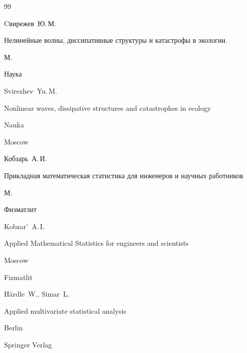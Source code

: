 \begin{thebibliography}{99}

\by Cвирежев~Ю.\,М. 

\book Нелинейные волны, диссипативные структуры и катастрофы в экологии. 

\publaddr М. 

\publ Наука



\misctransl

\by Svirezhev~Yu.\,M. 

\book Nonlinear waves, dissipative structures and catastrophes in ecology

\publ Nauka

\publaddr Moscow






\by Кобзарь~А.\,И. 

\book Прикладная математическая статистика для инженеров и научных работников

\publaddr М.

\publ Физматлит 



\misctransl

\by Kobzar'~A.\,I.

\book Applied Mathematical Statistics for engineers and scientists 

\publaddr Moscow

\publ Fizmatlit








\by H\"ardle~W., Simar~L. 

\book Applied multivariate statistical analysis

\publaddr Berlin

\publ Springer Verlag









\end{thebibliography}



